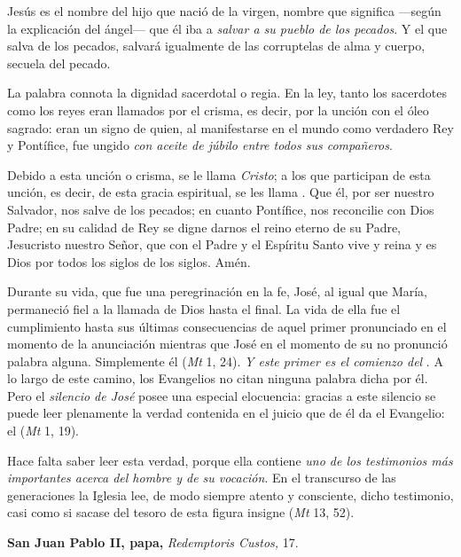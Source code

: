 Jesús es el nombre del hijo que nació de la virgen, nombre que significa ---según la explicación del ángel--- que él iba a \emph{salvar a su pueblo de los pecados}. Y el que salva de los pecados, salvará igualmente de las corruptelas de alma y cuerpo, secuela del pecado.

La palabra  connota la dignidad sacerdotal o regia. En la ley, tanto los sacerdotes como los reyes eran llamados  por el crisma, es decir, por la unción con el óleo sagrado: eran un signo de quien, al manifestarse en el mundo como verdadero Rey y Pontífice, fue ungido \emph{con aceite de júbilo entre todos sus compañeros}.

Debido a esta unción o crisma, se le llama \emph{Cristo}; a los que participan de esta unción, es decir, de esta gracia espiritual, se les llama . Que él, por ser nuestro Salvador, nos salve de los pecados; en cuanto Pontífice, nos reconcilie con Dios Padre; en su calidad de Rey se digne darnos el reino eterno de su Padre, Jesucristo nuestro Señor, que con el Padre y el Espíritu Santo vive y reina y es Dios por todos los siglos de los siglos. Amén.

Durante su vida, que fue una peregrinación en la fe, José, al igual que María, permaneció fiel a la llamada de Dios hasta el final. La vida de ella fue el cumplimiento hasta sus últimas consecuencias de aquel primer  pronunciado en el momento de la anunciación mientras que José en el momento de su  no pronunció palabra alguna. Simplemente él  (\emph{Mt} 1, 24). \emph{Y este primer  es el comienzo del }. A lo largo de este camino, los Evangelios no citan ninguna palabra dicha por él. Pero el \emph{silencio de José} posee una especial elocuencia: gracias a este silencio se puede leer plenamente la verdad contenida en el juicio que de él da el Evangelio: el  (\emph{Mt} 1, 19).

Hace falta saber leer esta verdad, porque ella contiene \emph{uno de los testimonios más importantes acerca del hombre y de su vocación}. En el transcurso de las generaciones la Iglesia lee, de modo siempre atento y consciente, dicho testimonio, casi como si sacase del tesoro de esta figura insigne  (\emph{Mt} 13, 52).

\textbf{San Juan Pablo II, papa,} \emph{Redemptoris Custos,} 17.



